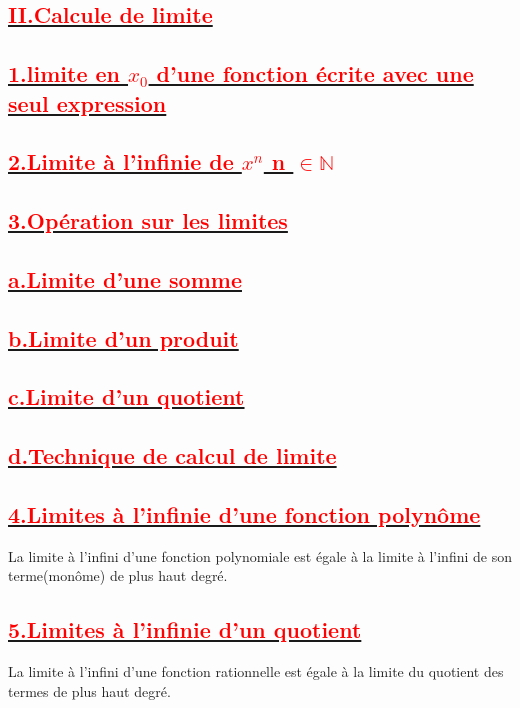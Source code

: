 \documentclass[12pt]{article}
\begin{document}
\subsection*{\underline{\textbf{\textcolor{red}{II.Calcule de limite}}}}

\subsection*{\underline{\textbf{\textcolor{red}{1.limite en $x_{0}$ d'une fonction écrite avec une seul expression}}}}
\subsection*{\underline{\textbf{\textcolor{red}{2.Limite à l'infinie de $x^{n}$ n $\in\mathbb{N}$}}}}
\subsection*{\underline{\textbf{\textcolor{red}{3.Opération sur les limites}}}}
\subsection*{\underline{\textbf{\textcolor{red}{a.Limite d'une somme}}}}
\subsection*{\underline{\textbf{\textcolor{red}{b.Limite d'un produit}}}}
\subsection*{\underline{\textbf{\textcolor{red}{c.Limite d'un quotient}}}}
\subsection*{\underline{\textbf{\textcolor{red}{d.Technique de calcul de limite}}}}
\subsection*{\underline{\textbf{\textcolor{red}{4.Limites à l'infinie d'une fonction polynôme}}}}
La limite à l'infini d'une fonction polynomiale est égale à la limite à l'infini de son terme(monôme) de plus haut degré.
\subsection*{\underline{\textbf{\textcolor{red}{5.Limites à l'infinie d'un quotient}}}}
La limite à l'infini d'une fonction rationnelle est égale à la limite du quotient des termes de plus haut degré.
\end{document}
